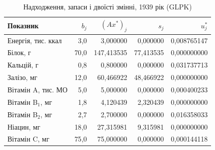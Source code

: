 \begin{table}[htbp]
\centering\small
\caption{Надходження, запаси і двоїсті змінні, 1939 рік (GLPK)}
\label{tab:glpk-dual-1939}
\begin{tabular}{lrrrr}
\toprule
Показник & $b_j$ & $(Ax^*)_j$ & $s_j$ & $u_j^*$ \\
\midrule
Енергія, тис. ккал & 3{,}0 & 3{,}000000 & 0{,}000000 & 0{,}008765147 \\
Білок, г & 70{,}0 & 147{,}413535 & 77{,}413535 & 0{,}000000000 \\
Кальцій, г & 0{,}8 & 0{,}800000 & 0{,}000000 & 0{,}031737713 \\
Залізо, мг & 12{,}0 & 60{,}466922 & 48{,}466922 & 0{,}000000000 \\
Вітамін A, тис. МО & 5{,}0 & 5{,}000000 & 0{,}000000 & 0{,}000400233 \\
Вітамін B$_1$, мг & 1{,}8 & 4{,}120439 & 2{,}320439 & 0{,}000000000 \\
Вітамін B$_2$, мг & 2{,}7 & 2{,}700000 & 0{,}000000 & 0{,}016358033 \\
Ніацин, мг & 18{,}0 & 27{,}315981 & 9{,}315981 & 0{,}000000000 \\
Вітамін C, мг & 75{,}0 & 75{,}000000 & 0{,}000000 & 0{,}000144118 \\
\bottomrule
\end{tabular}
\end{table}
